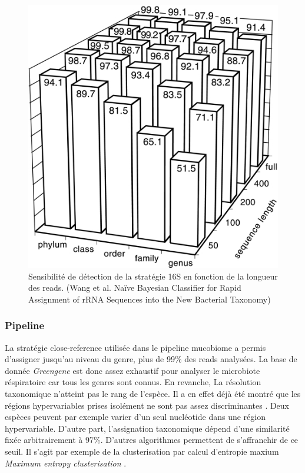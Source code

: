 \documentclass[12pt,a4paper]{article}
\begin{document}
\begin{figure}
\begin{center}
\includegraphics[scale=3]{img/zam.jpg}\hfill
\end{center}
\caption{Sensibilité de détection de la stratégie 16S en fonction de la longueur des reads. (Wang et al. Naïve Bayesian Classifier for Rapid Assignment of rRNA Sequences into the New Bacterial Taxonomy) }
\label{rnasens}
\end{figure}

\subsubsection{Pipeline}
La stratégie close-reference utilisée dans le pipeline mucobiome a permis d'assigner jusqu'au niveau du genre, plus de 99\% des reads analysées. La base de donnée \textit{Greengene} est donc assez exhaustif pour analyser le microbiote réspiratoire car tous les genres sont connus.
En revanche, La résolution taxonomique n'atteint pas le rang de l'espèce. Il a en effet déjà été montré que les régions hypervariables prises isolément ne sont pas assez discriminantes \cite{Yang2016}. Deux espèces peuvent par exemple varier d'un seul nucléotide dans une région hypervariable.
D'autre part, l'assignation taxonomique dépend d'une similarité fixée arbitrairement à 97\%. D'autres algorithmes permettent de s'affranchir de ce seuil. Il s'agit par exemple de la clusterisation par calcul d'entropie maxium \textit{Maximum entropy clusterisation} \cite{Bobadilla2015}.
\end{document}
